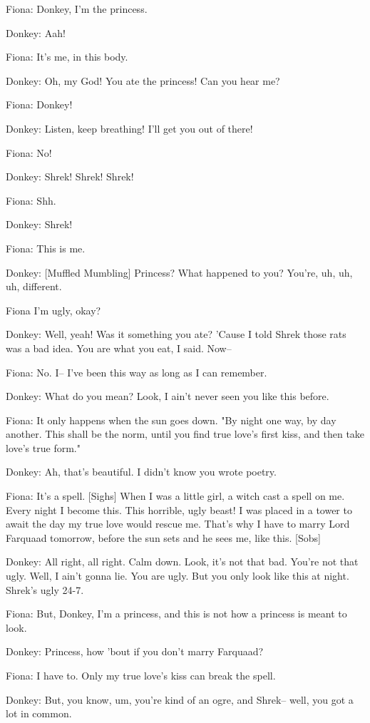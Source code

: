 \documentclass{article}
\begin{document}
Fiona:
Donkey, I'm the princess.

Donkey:
Aah!

Fiona:
It's me, in this body.

Donkey:
Oh, my God! You ate the princess! Can you hear me?

Fiona:
Donkey!

Donkey:
Listen, keep breathing! I'll get you out of there!

Fiona:
No!

Donkey:
Shrek! Shrek! Shrek!

Fiona:
Shh.

Donkey:
Shrek!

Fiona:
This is me.

Donkey:
[Muffled Mumbling] Princess? What happened to you? You're, uh, uh, uh, different.

Fiona I'm ugly, okay?

Donkey:
Well, yeah! Was it something you ate? 'Cause I told Shrek those rats was a bad idea. You are what you eat, I said. Now--

Fiona:
No. I-- I've been this way as long as I can remember.

Donkey:
What do you mean? Look, I ain't never seen you like this before.

Fiona:
It only happens when the sun goes down. "By night one way, by day another. This shall be the norm, until you find true love's first kiss, and then take love's true form."

Donkey:
Ah, that's beautiful. I didn't know you wrote poetry.

Fiona:
It's a spell. [Sighs] When I was a little girl, a witch cast a spell on me. Every night I become this. This horrible, ugly beast! I was placed in a tower to await the day my true love would rescue me. That's why I have to marry Lord Farquaad tomorrow, before the sun sets and he sees me, like this. [Sobs]

Donkey:
All right, all right. Calm down. Look, it's not that bad. You're not that ugly. Well, I ain't gonna lie. You are ugly. But you only look like this at night. Shrek's ugly 24-7.

Fiona:
But, Donkey, I'm a princess, and this is not how a princess is meant to look.

Donkey:
Princess, how 'bout if you don't marry Farquaad?

Fiona:
I have to. Only my true love's kiss can break the spell.

Donkey:
But, you know, um, you're kind of an ogre, and Shrek-- well, you got a lot in common.
\end{document}
